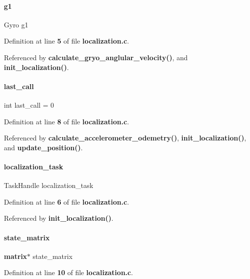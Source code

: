 \paragraph{g1}
{\footnotesize\ttfamily Gyro g1\hspace{0.3cm}{\ttfamily [static]}}



Definition at line \textbf{ 5} of file \textbf{ localization.\+c}.



Referenced by \textbf{ calculate\+\_\+gryo\+\_\+anglular\+\_\+velocity()}, and \textbf{ init\+\_\+localization()}.

\mbox{\label{a00119_a0f327d31da83831114e7417abb7b6b63}} 
\paragraph{last\+\_\+call}
{\footnotesize\ttfamily int last\+\_\+call = 0\hspace{0.3cm}{\ttfamily [static]}}



Definition at line \textbf{ 8} of file \textbf{ localization.\+c}.



Referenced by \textbf{ calculate\+\_\+accelerometer\+\_\+odemetry()}, \textbf{ init\+\_\+localization()}, and \textbf{ update\+\_\+position()}.

\mbox{\label{a00119_a5be50f74f0f5a3aea13f2bd8db891488}} 
\paragraph{localization\+\_\+task}
{\footnotesize\ttfamily Task\+Handle localization\+\_\+task\hspace{0.3cm}{\ttfamily [static]}}



Definition at line \textbf{ 6} of file \textbf{ localization.\+c}.



Referenced by \textbf{ init\+\_\+localization()}.

\mbox{\label{a00119_a424e677cc0238390cb4a3068a6f3518c}} 
\paragraph{state\+\_\+matrix}
{\footnotesize\ttfamily \textbf{ matrix}$\ast$ state\+\_\+matrix}



Definition at line \textbf{ 10} of file \textbf{ localization.\+c}.

